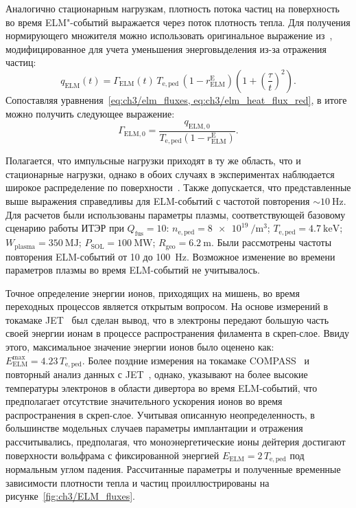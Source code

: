 Аналогично стационарным нагрузкам, плотность потока частиц на поверхность во время ELM"-событий выражается через поток плотность тепла. Для получения нормирующего множителя можно использовать оригинальное выражение из~\cite{Fundamenski2006, Moulton2013}, модифицированное для учета уменьшения энерговыделения из-за отражения частиц:
\begin{equation}
	\label{eq:ch3/elm_heat_flux_red}
	q_{\mathrm{ELM}}(t)=\Gamma_{\mathrm{ELM}}(t)\,T_{\mathrm{e,ped}}\,(1-r_{\mathrm{ELM}}^{\mathrm{E}})\left(1+\left(\frac{\tau}{t}\right)^2\right).
\end{equation}
Сопоставляя уравнения~\cref{eq:ch3/elm_fluxes, eq:ch3/elm_heat_flux_red}, в итоге можно получить следующее выражение:
\begin{equation}
	\Gamma_{\mathrm{ELM,0}}=\frac{q_{\mathrm{ELM,0}}}{T_{\mathrm{e,ped}}(1-r_{\mathrm{ELM}}^{\mathrm{E}})}.
\end{equation}

Полагается, что импульсные нагрузки приходят в ту же область, что и стационарные нагрузки, однако в обоих случаях в экспериментах наблюдается широкое распределение по поверхности~\cite{Pitts2019, Orrico2023, Eich2017}. Также допускается, что представленные выше выражения справедливы для ELM-событий с частотой повторения $\sim\SI{10}{\hertz}$. Для расчетов были использованы параметры плазмы, соответствующей базовому сценарию работы ИТЭР при $Q_\mathrm{fus}=10$: $n_{\mathrm{e,ped}}=\SI{8e19}{\per\meter\cubed}$; $T_{\mathrm{e,ped}}=\SI{4.7}{\kilo\electronvolt}$; $W_{\mathrm{plasma}}=\SI{350}{\mega\joule}$; $P_{\mathrm{SOL}}=\SI{100}{\mega\watt}$; $R_{\mathrm{geo}}=\SI{6.2}{\meter}$. Были рассмотрены частоты повторения ELM-событий от \num{10} до \SI{100}{\hertz}. Возможное изменение во времени параметров плазмы во время ELM-событий не учитывалось.

Точное определение энергии ионов, приходящих на мишень, во время переходных процессов является открытым вопросом. На основе измерений в токамаке JET~\cite{Guillemaut2015, Guillemaut2018} был сделан вывод, что в электроны передают большую часть своей энергии ионам в процессе распространения филамента в скреп-слое. Ввиду этого, максимальное значение энергии ионов было оценено как: $E_{\mathrm{ELM}}^{\mathrm{max}}=4.23\,T_{\mathrm{e,ped}}$. Более поздние измерения на токамаке COMPASS~\cite{Adamek2020} и повторный анализ данных с JET~\cite{Horacek2023}, однако, указывают на более высокие температуры электронов в области дивертора во время ELM-событий, что предполагает отсутствие значительного ускорения ионов во время распространения в скреп-слое. Учитывая описанную неопределенность, в большинстве модельных случаев параметры имплантации и отражения рассчитывались, предполагая, что моноэнергетические ионы дейтерия достигают поверхности вольфрама с фиксированной энергией $E_{\mathrm{ELM}}=2\,T_{\mathrm{e,ped}}$ под нормальным углом падения. Рассчитанные параметры и полученные временные зависимости плотности тепла и частиц проиллюстрированы на рисунке~\ref{fig:ch3/ELM_fluxes}.

